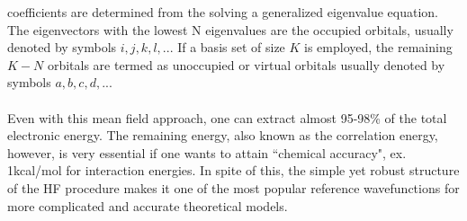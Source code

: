 coefficients are determined from the solving a generalized eigenvalue equation.
The eigenvectors with the lowest N eigenvalues are the occupied orbitals, usually 
denoted by symbols $i,j,k,l,..$. If a basis set of size $K$ is employed, the remaining $K-N$
orbitals are termed as unoccupied or virtual orbitals usually denoted by symbols $a,b,c,d,..$.
\\\\
Even with this mean field approach, one can extract almost 95-98\% of the total 
electronic energy. The remaining energy, also known as the correlation energy,
however, is very essential if one wants to attain ``chemical accuracy", ex.  
1kcal/mol for interaction energies. In spite of this, the simple yet robust 
structure of the HF procedure makes it one of the most popular reference 
wavefunctions for more complicated and accurate theoretical models.

